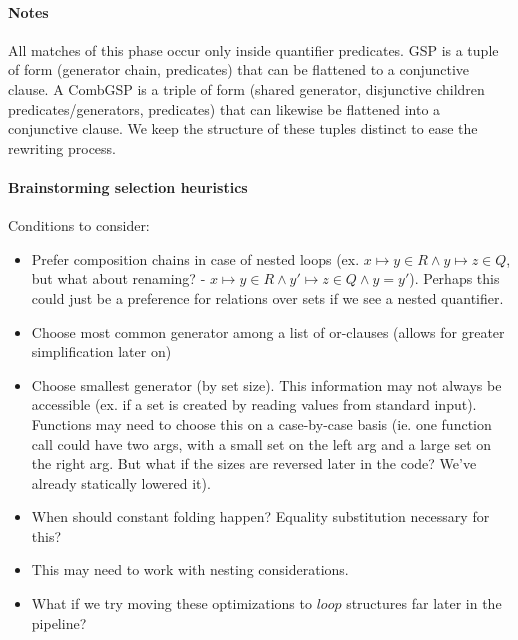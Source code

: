 \documentclass{article}
\begin{document}
\paragraph{Notes} All matches of this phase occur only inside quantifier predicates. GSP is a tuple of form (generator chain, predicates) that can be flattened to a conjunctive clause. A CombGSP is a triple of form (shared generator, disjunctive children predicates/generators, predicates) that can likewise be flattened into a conjunctive clause. We keep the structure of these tuples distinct to ease the rewriting process.

\paragraph{Brainstorming selection heuristics}
Conditions to consider:
\begin{itemize}
  \item Prefer composition chains in case of nested loops (ex. $x \mapsto y \in R \land y \mapsto z \in Q$, but what about renaming? - $x \mapsto y \in R \land y' \mapsto z \in Q \land y = y'$). Perhaps this could just be a preference for relations over sets if we see a nested quantifier.
  \item Choose most common generator among a list of or-clauses (allows for greater simplification later on)
  \item Choose smallest generator (by set size). This information may not always be accessible (ex. if a set is created by reading values from standard input). Functions may need to choose this on a case-by-case basis (ie. one function call could have two args, with a small set on the left arg and a large set on the right arg. But what if the sizes are reversed later in the code? We've already statically lowered it).
  \item When should constant folding happen? Equality substitution necessary for this?
  \item This may need to work with nesting considerations.
  \item What if we try moving these optimizations to $loop$ structures far later in the pipeline?
\end{itemize}
\end{document}

